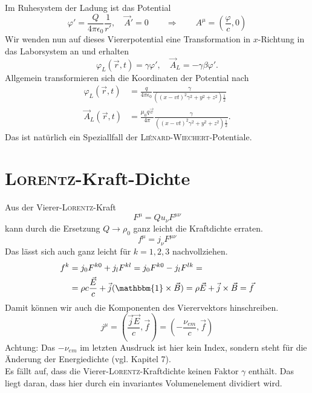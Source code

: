 Im Ruhesystem der Ladung ist das Potential
\begin{equation*}
\varphi' = \frac{Q}{4\pi\epsilon_0}\frac{1}{r'},\quad\vec{A}' = 0 \qquad\Rightarrow\qquad A^\mu=\left(\frac{\varphi}{c},0\right)
\end{equation*}
Wir wenden nun auf dieses Viererpotential eine Transformation in $x$-Richtung in das Laborsystem an und erhalten
\begin{equation*}
\varphi_L(\vec{r},t) = \gamma\varphi',\quad\vec{A}_L = -\gamma\beta\varphi'.
\end{equation*}
Allgemein transformieren sich die Koordinaten der Potential nach
\begin{align*}
\varphi_L(\vec{r},t) &=\frac{q}{4\pi\epsilon_0}\frac{\gamma}{\left((x-vt)^2\gamma^2 + y^2+z^2\right)\frac{1}{2}}\\
\vec{A}_L(\vec{r},t) &=\frac{\mu_0q\vec{v}}{4\pi}\frac{\gamma}{\left((x-vt)^2\gamma^2 + y^2+z^2\right)\frac{1}{2}}.
\end{align*}
Das ist natürlich ein Speziallfall der \textsc{Liénard-Wiechert}-Potentiale.

\section{\textsc{Lorentz}-Kraft-Dichte}

Aus der Vierer-\textsc{Lorentz}-Kraft 
\begin{equation*}
F^\mu = Qu_\nu F^{\mu\nu}
\end{equation*}
kann durch die Ersetzung $Q\rightarrow\rho_0$ ganz leicht die Kraftdichte erraten.
\begin{equation*}
f^\mu = j_\nu F^{\mu\nu}
\end{equation*}
Das lässt sich auch ganz leicht für $k=1,2,3$ nachvollziehen.
\begin{align*}
f^k &= j_0F^{k0} + j_l F^{kl} = j_0 F^{k0}-j_l F^{lk} = \\
&=\rho c\frac{\vec{E}}{c} + \vec{j}(\mathbbm{1}\times\vec{B})=\rho\vec{E}+\vec{j}\times\vec{B} = \vec{f}
\end{align*}
Damit können wir auch die Komponenten des Vierervektors hinschreiben.
\begin{equation*}
j^\mu = \left(\frac{\vec{j}\vec{E}}{c},\vec{f}\right) = \left(-\frac{\nu_\textit{em}}{c},\vec{f}\right)
\end{equation*}
Achtung: Das $-\nu_\textit{em}$ im letzten Ausdruck ist hier kein Index, sondern steht für die Änderung der Energiedichte (vgl. Kapitel 7).\\
Es fällt auf, dass die Vierer-\textsc{Lorentz}-Kraftdichte keinen Faktor $\gamma$ enthält. Das liegt daran, dass hier durch ein invariantes Volumenelement dividiert wird.

